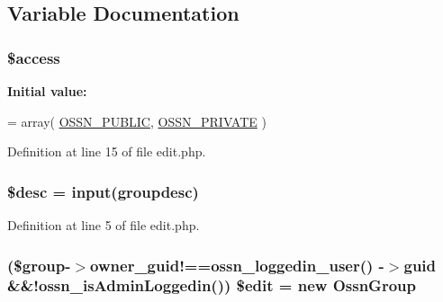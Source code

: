 \subsection{Variable Documentation}
\subsubsection[{\texorpdfstring{\$access}{$access}}]{\setlength{\rightskip}{0pt plus 5cm}\$access}\hypertarget{components_2_ossn_groups_2actions_2group_2edit_8php_ad7fd03ae69de40b00cc4758c23a4404e}{}\label{components_2_ossn_groups_2actions_2group_2edit_8php_ad7fd03ae69de40b00cc4758c23a4404e}
{\bfseries Initial value\+:}
\begin{DoxyCode}
= array(
    \hyperlink{ossn_8lib_8system_8php_a8efdc824fa9025d0c02ee7c512aafdfa}{OSSN\_PUBLIC},
    \hyperlink{ossn_8lib_8system_8php_a982684c5e83907832c9079348ec7edd3}{OSSN\_PRIVATE}
)
\end{DoxyCode}


Definition at line 15 of file edit.\+php.

\subsubsection[{\texorpdfstring{\$desc}{$desc}}]{\setlength{\rightskip}{0pt plus 5cm}\$desc = {\bf input}(\textquotesingle{}groupdesc\textquotesingle{})}\hypertarget{components_2_ossn_groups_2actions_2group_2edit_8php_a31059b9e4d0c5af34df20da32232ea9a}{}\label{components_2_ossn_groups_2actions_2group_2edit_8php_a31059b9e4d0c5af34df20da32232ea9a}


Definition at line 5 of file edit.\+php.

\subsubsection[{\texorpdfstring{\$edit}{$edit}}]{ (\$group-\/$>$owner\+\_\+guid!=={\bf ossn\+\_\+loggedin\+\_\+user}() -\/$>$guid \&\&!{\bf ossn\+\_\+is\+Admin\+Loggedin}()) \$edit = new {\bf Ossn\+Group}}\hypertarget{components_2_ossn_groups_2actions_2group_2edit_8php_a39a4ea3de75a80df26305f97a2b76ccb}{}\label{components_2_ossn_groups_2actions_2group_2edit_8php_a39a4ea3de75a80df26305f97a2b76ccb}


